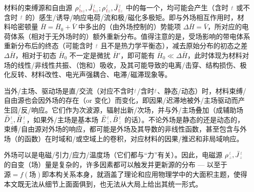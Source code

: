 材料的束缚源和自由源 ${\rho}^{\;\!\mathcolor{gray}{t}}_{\;\!\textcolor{Maroon}{\text{b}}\mathcolor{gray}{z}}, \bar{J}^{\;\!\mathcolor{gray}{t}}_{\;\!\textcolor{Maroon}{\text{b}}\mathcolor{gray}{z}};{\rho}^{\;\!\mathcolor{gray}{t}}_{\;\!\textcolor{Maroon}{\text{f}}\mathcolor{gray}{z}}, \bar{J}^{\;\!\mathcolor{gray}{t}}_{\;\!\textcolor{Maroon}{\text{f}}\mathcolor{gray}{z}}$ 中的每一个，均可能会产生（含时 $\mathcolor{gray}{t}$ 或不含时 $\mathcolor{gray}{t}$ 的）感生/诱导/响应电荷/流\cite{markelExternalInducedFree2018,raabMultipoleTheoryElectromagnetism2004,tsukermanPolarizationArbitraryCharge2021a}和极/磁化多极矩。即与外场相互作用时，材料哈密顿量 $\bar{H} = \bar{H}_0 + \bar{V}$ 中多出的（由外场控制的）势能项 $\Delta \bar{H} = \bar{V}$\cite{boydNonlinearOptics2019,raabMultipoleTheoryElectromagnetism2004}，所对应的电荷体系（相对于无外场时的）额外重新分布。值得注意的是，受场影响的带电体系重新分布后的终态（可能含时 $\mathcolor{gray}{t}$ 且不是热力学平衡态），减去原始分布的初态之差 $\Delta \bar{H}$，相对于初态 $\bar{H}_0$ 不一定是微扰 $\bar{H}'$\cite{boydNonlinearOptics2019}，即可能有 $\bar{H}_0 \ll \Delta \bar{H}$，此时体现为材料对场的线性/非线性共振、（饱和）吸收，及其可能导致的电离/击穿\cite{boydNonlinearOptics2019}、结构损伤、极化反转、材料改性\cite{xuFemtosecondLaserWriting2022,weiExperimentalDemonstrationThreedimensional2018,xuThreedimensionalNonlinearPhotonic2018,keren-zurNewDimensionNonlinear2018}、电光声强耦合、电滞/磁滞现象等。

当外/主场、驱动场是直/交流（对应不含时$\mathcolor{gray}{t}$/含时$\mathcolor{gray}{t}$、静态/动态）时，材料束缚/自由源也会因外场的存在（or 变化）而变化，即因果/迟滞地被外/主场驱动而产生回/反/响应。它们作为次波源，辐射出新/次场，并与外/主场叠加（成辅助场 $\bar{D}^{\;\!\mathcolor{gray}{t}}_{\;\!\mathcolor{gray}{z}}, \bar{H}^{\;\!\mathcolor{gray}{t}}_{\;\!\mathcolor{gray}{z}}$，如果外/主场是基本场 $\bar{E}^{\;\!\mathcolor{gray}{t}}_{\;\!\mathcolor{gray}{z}}, \bar{B}^{\;\!\mathcolor{gray}{t}}_{\;\!\mathcolor{gray}{z}}$ 的话）。不论外场是静态的还是动态的，束缚/自由源对外场的响应，都可能是外场及其导数的非线性函数，甚至包含与外场（的函数）在时域和/或空域上的卷积，对应材料的因果/推迟和非局域响应。

外场可以是电磁/引力/应力/温度场（它们都与“力”有关）。因此，电磁源 ${\rho}^{\;\!\mathcolor{gray}{t}}_{\;\!\mathcolor{gray}{z}}, \bar{J}^{\;\!\mathcolor{gray}{t}}_{\;\!\mathcolor{gray}{z}}$ 的自变（场）量是复杂的，许多因素都可以触发并更新源的分布 --- 以至于$\text{源} = f(\text{场})$即本构关系本身，就涵盖了理论和应用物理学中的大面积主题，使得本文既无法从细节上面面俱到，也无法从大局上给出其统一形式。

